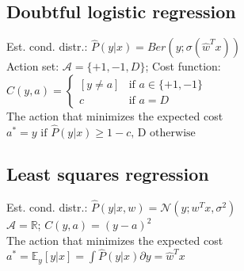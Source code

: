 
\subsection*{Doubtful logistic regression}
	 Est. cond. distr.: $\hat{P}(y|x) = Ber(y;\sigma(\hat{w}^Tx))$\\
	 Action set: $\mathcal{A} = \{ +1, -1, D\}$;  Cost function:\\
	 $C(y,a) = \begin{cases}
			[y \neq a] &\text{if } a \in \{+1,-1\}\\
			c &\text{if } a = D
       \end{cases}$\\
The action that minimizes the expected cost\\
$a^* = y \text{ if } \hat{P}(y|x) \geq 1-c\text{, D otherwise}$

\subsection*{Least squares regression}
	 Est. cond. distr.: $\hat{P}(y|x,w) = \mathcal{N}(y;w^Tx, \sigma^2)$\\
 $\mathcal{A} = \mathbb{R}$; $C(y,a) = (y-a)^2$\\
The action that minimizes the expected cost\\
$a^* = \mathbb{E}_y[y|x] = \int \hat{P}(y | x) \partial y = \hat{w}^Tx$

